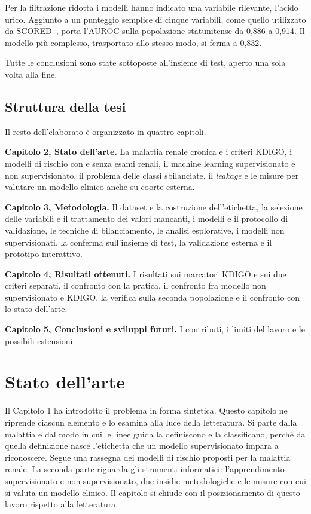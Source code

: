 \documentclass[a4paper, 12pt, oneside]{book}
\begin{document}
Per la filtrazione ridotta i modelli hanno indicato una variabile rilevante, l'acido urico. Aggiunto a un punteggio semplice di cinque variabili, come quello utilizzato da SCORED~\cite{bang_screening_2007}, porta l'AUROC sulla popolazione statunitense da 0,886 a 0,914. Il modello più complesso, trasportato allo stesso modo, si ferma a 0,832.

Tutte le conclusioni sono state sottoposte all'insieme di test, aperto una sola volta alla fine.

\section{Struttura della tesi}
Il resto dell'elaborato è organizzato in quattro capitoli.

\textbf{Capitolo 2, Stato dell'arte.} La malattia renale cronica e i criteri KDIGO, i modelli di rischio con e senza esami renali, il machine learning supervisionato e non supervisionato, il problema delle classi sbilanciate, il \textit{leakage} e le misure per valutare un modello clinico anche su coorte esterna.
 
\textbf{Capitolo 3, Metodologia.} Il dataset e la costruzione dell'etichetta, la selezione delle variabili e il trattamento dei valori mancanti, i modelli e il protocollo di validazione, le tecniche di bilanciamento, le analisi esplorative, i modelli non supervisionati, la conferma sull'insieme di test, la validazione esterna e il prototipo interattivo.

\textbf{Capitolo 4, Risultati ottenuti.} I risultati sui marcatori KDIGO e sui due criteri separati, il confronto con la pratica, il confronto fra modello non supervisionato e KDIGO, la verifica sulla seconda popolazione e il confronto con lo stato dell'arte.

\textbf{Capitolo 5, Conclusioni e sviluppi futuri.} I contributi, i limiti del lavoro e le possibili estensioni.

\chapter{Stato dell'arte}

Il Capitolo 1 ha introdotto il problema in forma sintetica. Questo capitolo ne riprende ciascun elemento e lo esamina alla luce della letteratura. Si parte dalla malattia e dal modo in cui le linee guida la definiscono e la classificano, perché da quella definizione nasce l'etichetta che un modello supervisionato impara a riconoscere. Segue una rassegna dei modelli di rischio proposti per la malattia renale. La seconda parte riguarda gli strumenti informatici: l'apprendimento supervisionato e non supervisionato, due insidie metodologiche e le misure con cui si valuta un modello clinico. Il capitolo si chiude con il posizionamento di questo lavoro rispetto alla letteratura.
\end{document}
